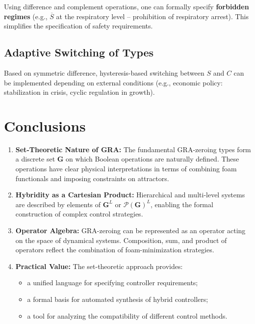 \documentclass[12pt,a4paper]{article}
\newcommand{\G}{\mathbf{G}}
\newcommand{\Pset}{\mathcal{P}}
\begin{document}
Using difference and complement operations, one can formally specify \textbf{forbidden regimes} (e.g., $\overline{S}$ at the respiratory level – prohibition of respiratory arrest). This simplifies the specification of safety requirements.

\subsection{Adaptive Switching of Types}

Based on symmetric difference, hysteresis-based switching between $S$ and $C$ can be implemented depending on external conditions (e.g., economic policy: stabilization in crisis, cyclic regulation in growth).

\section{Conclusions}
\label{sec:conclusions}

\begin{enumerate}
    \item \textbf{Set-Theoretic Nature of GRA:} The fundamental GRA-zeroing types form a discrete set $\G$ on which Boolean operations are naturally defined. These operations have clear physical interpretations in terms of combining foam functionals and imposing constraints on attractors.
    \item \textbf{Hybridity as a Cartesian Product:} Hierarchical and multi-level systems are described by elements of $\G^L$ or $\Pset(\G)^L$, enabling the formal construction of complex control strategies.
    \item \textbf{Operator Algebra:} GRA-zeroing can be represented as an operator acting on the space of dynamical systems. Composition, sum, and product of operators reflect the combination of foam-minimization strategies.
    \item \textbf{Practical Value:} The set-theoretic approach provides:
    \begin{itemize}
        \item a unified language for specifying controller requirements;
        \item a formal basis for automated synthesis of hybrid controllers;
        \item a tool for analyzing the compatibility of different control methods.
    \end{itemize}
\end{enumerate}
\end{document}

